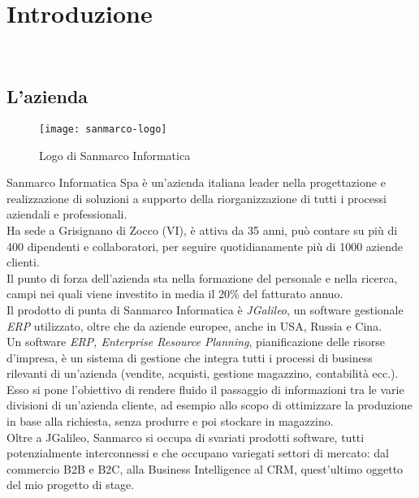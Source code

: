 \newpage
\chapter{Introduzione}
\label{cap:introduzione}

\\


\section{L'azienda}

\begin{figure}[h]
\centering
\texttt{[image: sanmarco-logo]}
\caption{Logo di Sanmarco Informatica}
\end{figure}
Sanmarco Informatica Spa è un'azienda italiana leader nella progettazione e realizzazione di soluzioni a supporto della riorganizzazione di tutti i processi aziendali e professionali. \\ Ha sede a  Grisignano di Zocco (VI), è attiva da 35 anni, può contare su più di 400 dipendenti e collaboratori, per seguire quotidianamente più di 1000 aziende clienti. \\ 
Il punto di forza dell'azienda sta nella formazione del personale e nella ricerca, campi nei quali viene investito in media il 20\% del fatturato annuo. \\
Il prodotto di punta di  Sanmarco Informatica è \emph{JGalileo}, un software gestionale \emph{ERP} utilizzato, oltre che da aziende europee, anche in USA, Russia e Cina.\\
Un software \emph{ERP, Enterprise Resource Planning}, pianificazione delle risorse d'impresa, è un sistema di gestione che integra tutti i processi di business rilevanti di un'azienda (vendite, acquisti, gestione magazzino, contabilità ecc.).\\Esso si pone l'obiettivo di rendere fluido il passaggio di informazioni tra le varie divisioni di un'azienda cliente, ad esempio allo scopo di ottimizzare la produzione in base alla richiesta, senza produrre e poi stockare in magazzino.\\
Oltre a JGalileo, Sanmarco si occupa di svariati prodotti software, tutti potenzialmente interconnessi e che occupano variegati settori di mercato: dal commercio B2B e B2C, alla Business Intelligence al CRM, quest'ultimo oggetto del mio progetto di stage.\\ 


